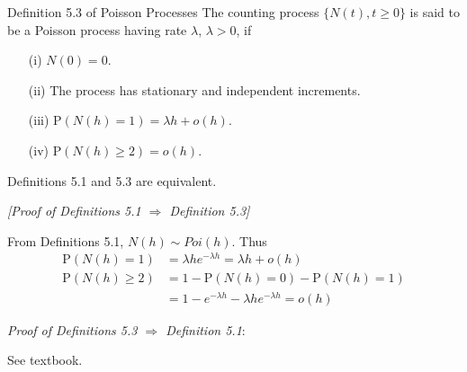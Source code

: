 \documentclass[letterpaper,handout, mathserif]{beamer}
\def\p{\mathrm P}
\begin{document}
\begin{frame}{Definition 5.3 of Poisson Processes}
The counting process $\{N(t), t \ge 0\}$ is said to be a Poisson
process having rate $\lambda$, $\lambda  > 0$, if
\begin{itemize}
\item[(i)] $N(0) = 0$.
\item[(ii)] The process has stationary and independent increments.
\item[(iii)] $\p(N(h) = 1) = \lambda h+o(h)$.
\item[(iv)] $\p(N(h) \ge 2) = o(h)$.
\end{itemize}\bigskip

\; Definitions 5.1 and 5.3 are equivalent.

{\em [Proof of Definitions 5.1 $\Rightarrow$ Definition 5.3]}

From Definitions 5.1, $N(h)\sim Poi(h)$. Thus
\begin{align*}
\p(N(h) =1)&=\lambda h e^{-\lambda h} = \lambda h+o(h)\\
\p(N(h) \ge 2)&=1-\p(N(h)=0)-\p(N(h)=1)\\
&=1-e^{-\lambda h}-\lambda he^{-\lambda h}=o(h)
\end{align*}

{\em Proof of Definitions 5.3 $\Rightarrow$ Definition 5.1}:\par
See textbook.
\end{frame}
\end{document}
